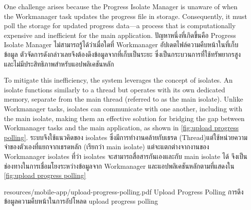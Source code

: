 \ifenglish
One challenge arises because the Progress Isolate Manager is unaware of when the Workmanager task updates the progress file in storage. Consequently, it must poll the storage for updated progress data—a process that is computationally expensive and inefficient for the main application.
\else
ปัญหาหนึ่งที่เกิดขึ้นคือ Progress Isolate Manager ไม่สามารถรู้ได้ว่าเมื่อใดที่ Workmanager อัปเดตไฟล์ความคืบหน้าในที่เก็บข้อมูล ตัวจัดการดังกล่าวเลยจึงต้องดึงข้อมูลจากที่เก็บเป็นระยะ ซึ่งเป็นกระบวนการที่ใช้ทรัพยากรสูงและไม่มีประสิทธิภาพสำหรับแอปพลิเคชันหลัก
\fi

\ifenglish
To mitigate this inefficiency, the system leverages the concept of isolates. An isolate functions similarly to a thread but operates with its own dedicated memory, separate from the main thread (referred to as the main isolate). Unlike Workmanager tasks, isolates can communicate with one another, including with the main isolate, making them an effective solution for bridging the gap between Workmanager tasks and the main application, as shown in \autoref{fig:upload progress polling}.
\else
ระบบจึงใช้แนวคิดของ isolates ซึ่งมีการทำงานคล้ายกับเธรด (Thread)แต่ใช้หน่วยความจำของตัวเองที่แยกจากเธรดหลัก (เรียกว่า main isolate) แต่จะแตกต่างจากงานของ Workmanager isolates ที่ว่า isolates จะสามารถสื่อสารกันเองและกับ main isolate ได้ จึงเป็นช่องทางในการเชื่อมโยงระหว่างข้อมูลจาก Workmanager และแอปพลิเคชันหลักตามที่แสดงใน \autoref{fig:upload progress polling}
\fi

\insertPDFfigure
{resources/mobile-app/upload-progress-polling.pdf}
{\ifenglish Upload Progress Polling \else การดึงข้อมูลความคืบหน้าในการอัปโหลด \fi}
{upload progress polling}
